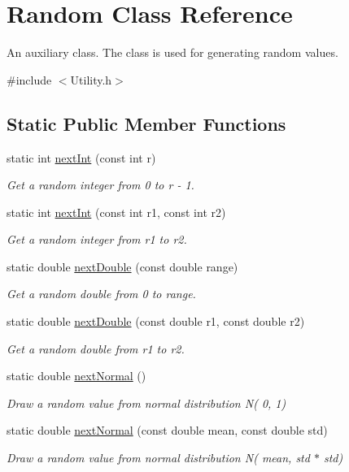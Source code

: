 \hypertarget{classRandom}{\section{Random Class Reference}
\label{classRandom}
}


An auxiliary class. The class is used for generating random values.  




{\ttfamily \#include $<$Utility.\-h$>$}

\subsection*{Static Public Member Functions}
\begin{DoxyCompactItemize}
\item 
static int \hyperlink{classRandom_a087f0acc28943cb0d2972f649a7157e4}{next\-Int} (const int r)
\begin{DoxyCompactList}\small\item\em Get a random integer from 0 to r -\/ 1. \end{DoxyCompactList}\item 
static int \hyperlink{classRandom_a5c90ef3456529a033571d01435e84f4d}{next\-Int} (const int r1, const int r2)
\begin{DoxyCompactList}\small\item\em Get a random integer from r1 to r2. \end{DoxyCompactList}\item 
static double \hyperlink{classRandom_a92ff638325ddfa7bafb1a17dd61db5ee}{next\-Double} (const double range)
\begin{DoxyCompactList}\small\item\em Get a random double from 0 to range. \end{DoxyCompactList}\item 
static double \hyperlink{classRandom_aeb0767ec85429c66f25035ddb4cce885}{next\-Double} (const double r1, const double r2)
\begin{DoxyCompactList}\small\item\em Get a random double from r1 to r2. \end{DoxyCompactList}\item 
static double \hyperlink{classRandom_aa0890fcdcc1173fffc223d7a2bf84324}{next\-Normal} ()
\begin{DoxyCompactList}\small\item\em Draw a random value from normal distribution N( 0, 1) \end{DoxyCompactList}\item 
static double \hyperlink{classRandom_a21be54b4bb78f9006292dd290a6e69bf}{next\-Normal} (const double mean, const double std)
\begin{DoxyCompactList}\small\item\em Draw a random value from normal distribution N( mean, std $\ast$ std) \end{DoxyCompactList}\end{DoxyCompactItemize}


